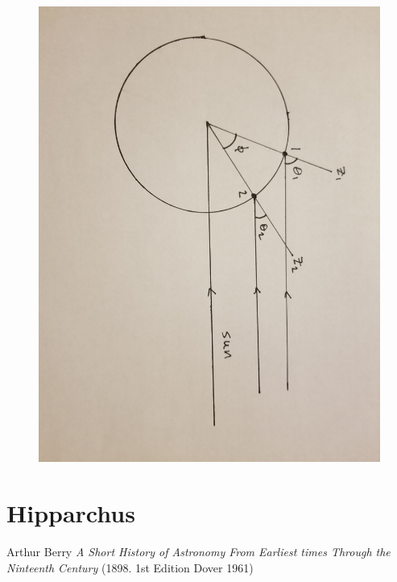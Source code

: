 \documentclass[11pt]{article} %
\begin{document}
\begin{figure}
  \centering
  \includegraphics[scale=.08]{figures/erato3.jpg}
  \caption{}
  \label{fig:erato3}
\end{figure}

\section{Hipparchus}



\begin{thebibliography}{9}
		Arthur Berry \textit{A Short History of Astronomy From Earliest times Through the Ninteenth Century} (1898. 1st Edition Dover 1961)
\end{thebibliography}
\end{document}
